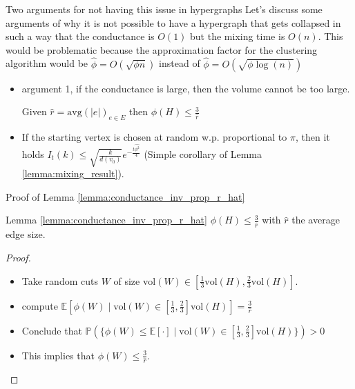 \documentclass[../main.tex]{subfiles}
\begin{document}
	\begin{frame}{Two arguments for not having this issue in hypergraphs}
		Let's discuss some arguments of why it is not possible to have a hypergraph that gets collapsed in such a way that the conductance is $O(1)$ but the mixing time is $O(n)$. This would be problematic because the approximation factor for the clustering algorithm would be $\hat{\phi} = O(\sqrt{\phi n})$ instead of $\hat{\phi}=O(\sqrt{\phi\log(n)})$
		\begin{itemize}
			\item argument 1, if the conductance is large, then the volume cannot be too large.
				\begin{lemma}
					\label{lemma:conductance_inv_prop_r_hat}
					Given $\hat{r} = \text{avg}(|e|)_{e\in E}$ then
					$\phi(H) \leq \frac{3}{\hat{r}}$
				\end{lemma}
			\item If the starting vertex is chosen at random w.p. proportional to $\pi$, then it holds $I_t(k)\leq \sqrt{\frac{k}{d(v_0)}}e^{-\frac{t\hat{\phi^2}}{4}}$ (Simple corollary of Lemma \ref{lemma:mixing_result}).
		\end{itemize}
	\end{frame}
	
	\begin{frame}{Proof of Lemma \ref{lemma:conductance_inv_prop_r_hat}}
		\begin{block}{Lemma \ref{lemma:conductance_inv_prop_r_hat}}
			$\phi(H)\leq \frac{3}{\hat{r}}$ with $\hat{r}$ the average edge size.
		\end{block}	
		\begin{proof}
			\begin{itemize}
				\item Take random cuts $W$ of size $\text{vol}(W)\in[\frac{1}{3}\text{vol}(H), \frac{2}{3}\text{vol}(H)]$.
				\item compute $\mathbb{E}[\phi(W)\mid \text{vol}(W)\in[\frac{1}{3},\frac{2}{3}]\text{vol}(H)] = \frac{3}{\hat{r}}$
				\item Conclude that $\mathbb{P}(\{\phi(W)\leq \mathbb{E}[\cdot] \mid \text{vol}(W)\in[\frac{1}{3},\frac{2}{3}]\text{vol}(H)\}) > 0$
				\item This implies that $\phi(W) \leq \frac{3}{\hat{r}}$.
			\end{itemize}
		\end{proof}
	\end{frame}
\end{document}
